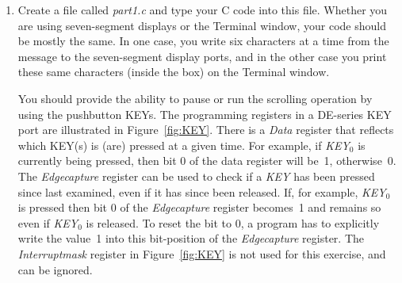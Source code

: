 \documentclass[epsfig,10pt,fullpage]{article}
\begin{document}
\begin{enumerate}
\item Create a file called {\it part1.c} and type your C code into this file. Whether you are 
using seven-segment displays or the Terminal window, your code should be mostly the same. In 
one case, you write six characters at a time from the message to the seven-segment display 
ports, and in the other case you print these same characters (inside the box) on the 
Terminal window. 

You should provide the ability to pause or run the scrolling operation by using the pushbutton 
KEYs. The programming registers in a DE-series KEY port are illustrated in Figure~\ref{fig:KEY}.
There is a {\it Data} register that reflects which KEY(s) is (are) pressed at a given time. For 
example, if {\it KEY}$_0$ is currently being pressed, then bit 0 of the data register will be~1,
otherwise~0. The {\it Edgecapture} register can be used to check if a {\it KEY} has been 
pressed since last examined, even if it has since been released. If, for example, 
{\it KEY}$_0$ is pressed then bit 0 of the {\it Edgecapture} register becomes~1 and 
remains so even if {\it KEY}$_0$ is released. To reset the bit to 0, a program has to 
explicitly write the value~1 into this bit-position of the {\it Edgecapture} register. 
The {\it Interruptmask} register in Figure~\ref{fig:KEY}
is not used for this exercise, and can be ignored.


\end{enumerate}
\end{document}

